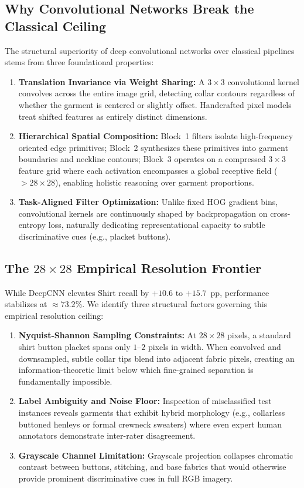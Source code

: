 \documentclass[conference]{IEEEtran}
\begin{document}
\subsection{Why Convolutional Networks Break the Classical Ceiling}
The structural superiority of deep convolutional networks over classical pipelines stems from three foundational properties:
\begin{enumerate}
    \item \textbf{Translation Invariance via Weight Sharing:} A $3\times3$ convolutional kernel convolves across the entire image grid, detecting collar contours regardless of whether the garment is centered or slightly offset. Handcrafted pixel models treat shifted features as entirely distinct dimensions.
    \item \textbf{Hierarchical Spatial Composition:} Block~1 filters isolate high-frequency oriented edge primitives; Block~2 synthesizes these primitives into garment boundaries and neckline contours; Block~3 operates on a compressed $3\times3$ feature grid where each activation encompasses a global receptive field ($>28\times28$), enabling holistic reasoning over garment proportions.
    \item \textbf{Task-Aligned Filter Optimization:} Unlike fixed HOG gradient bins, convolutional kernels are continuously shaped by backpropagation on cross-entropy loss, naturally dedicating representational capacity to subtle discriminative cues (e.g., placket buttons).
\end{enumerate}

\subsection{The $28\times28$ Empirical Resolution Frontier}
While DeepCNN elevates Shirt recall by $+10.6$ to $+15.7$~pp, performance stabilizes at ${\approx}73.2\%$. We identify three structural factors governing this empirical resolution ceiling:
\begin{enumerate}
    \item \textbf{Nyquist-Shannon Sampling Constraints:} At $28\times28$ pixels, a standard shirt button placket spans only $1$--$2$ pixels in width. When convolved and downsampled, subtle collar tips blend into adjacent fabric pixels, creating an information-theoretic limit below which fine-grained separation is fundamentally impossible.
    \item \textbf{Label Ambiguity and Noise Floor:} Inspection of misclassified test instances reveals garments that exhibit hybrid morphology (e.g., collarless buttoned henleys or formal crewneck sweaters) where even expert human annotators demonstrate inter-rater disagreement.
    \item \textbf{Grayscale Channel Limitation:} Grayscale projection collapses chromatic contrast between buttons, stitching, and base fabrics that would otherwise provide prominent discriminative cues in full RGB imagery.
\end{enumerate}
\end{document}
